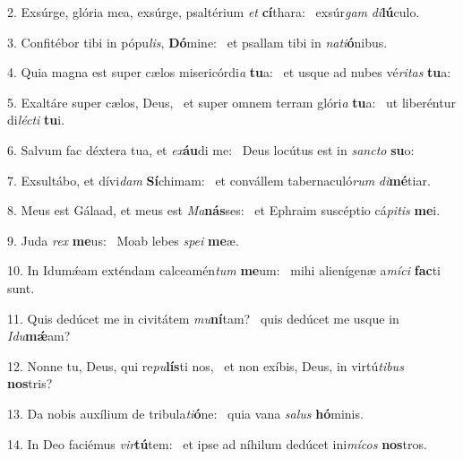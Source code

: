 2. Exsúrge, glória mea, exsúrge, psaltérium \textit{et} \textbf{cí}thara: \ast\  exsúr\textit{gam} \textit{di}\textbf{lú}culo.\

3. Confitébor tibi in pópu\textit{lis}, \textbf{Dó}mine: \ast\  et psallam tibi in \textit{na}\textit{ti}\textbf{ó}nibus.\

4. Quia magna est super cælos misericórdi\textit{a} \textbf{tu}a: \ast\  et usque ad nubes vé\textit{ri}\textit{tas} \textbf{tu}a:\

5. Exaltáre super cælos, Deus, \dag\  et super omnem terram glóri\textit{a} \textbf{tu}a: \ast\  ut liberéntur di\textit{léc}\textit{ti} \textbf{tu}i.\

6. Salvum fac déxtera tua, et \textit{ex}\textbf{áu}di me: \ast\  Deus locútus est in \textit{sanc}\textit{to} \textbf{su}o:\

7. Exsultábo, et dívi\textit{dam} \textbf{Sí}chimam: \ast\  et convállem tabernaculó\textit{rum} \textit{di}\textbf{mé}tiar.\

8. Meus est Gálaad, et meus est \textit{Ma}\textbf{nás}ses: \ast\  et Ephraim suscéptio cá\textit{pi}\textit{tis} \textbf{me}i.\

9. Juda \textit{rex} \textbf{me}us: \ast\  Moab lebes \textit{spe}\textit{i} \textbf{me}æ.\

10. In Idumǽam exténdam calceamén\textit{tum} \textbf{me}um: \ast\  mihi alienígenæ a\textit{mí}\textit{ci} \textbf{fac}ti sunt.\

11. Quis dedúcet me in civitátem \textit{mu}\textbf{ní}tam? \ast\  quis dedúcet me usque in \textit{I}\textit{du}\textbf{mǽ}am?\

12. Nonne tu, Deus, qui re\textit{pu}\textbf{lís}ti nos, \ast\  et non exíbis, Deus, in virtú\textit{ti}\textit{bus} \textbf{nos}tris?\

13. Da nobis auxílium de tribula\textit{ti}\textbf{ó}ne: \ast\  quia vana \textit{sa}\textit{lus} \textbf{hó}minis.\

14. In Deo faciémus \textit{vir}\textbf{tú}tem: \ast\  et ipse ad níhilum dedúcet ini\textit{mí}\textit{cos} \textbf{nos}tros.\

